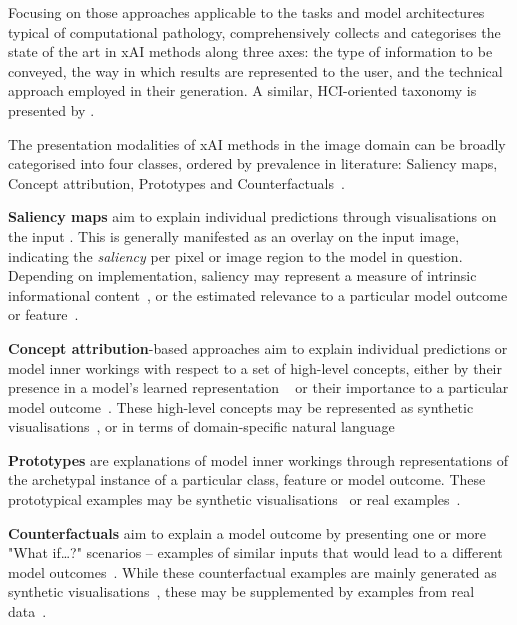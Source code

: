 \documentclass[final,5p,times,twocolumn,hyphens]{elsarticle}
\begin{document}
Focusing on those approaches applicable to the tasks and model architectures typical of computational pathology, \citet{poceviciute_survey_2020} comprehensively collects and categorises the state of the art in xAI methods along three axes: the type of information to be conveyed, the way in which results are represented to the user, and the technical approach employed in their generation. A similar, HCI-oriented taxonomy is presented by \citet{liao2020questioning}. 

The presentation modalities of xAI methods in the image domain can be broadly categorised into four classes, ordered by prevalence in literature: Saliency maps, Concept attribution, Prototypes and Counterfactuals~\cite{bodria_benchmarking_2021}.

\textbf{Saliency maps} aim to explain individual predictions through visualisations on the input \cite{MorchEtAl:1995:Saliency}. This is generally manifested as an overlay on the input image, indicating the \textit{saliency} per pixel or image region to the model in question. Depending on implementation, saliency may represent a measure of intrinsic informational content~\cite{KadirBrady:2001:Saliency}, or the estimated relevance to a particular model outcome or feature~\cite{SimonyanVedaldiZisserman:2013:DeepInside, springenberg2014striving, yosinski2015deepvisualization, LapuschkinEtAl:2016:LRP, selvaraju2017grad, ribeiro2018anchors}.

\textbf{Concept attribution}-based approaches aim to explain individual predictions or model inner workings with respect to a set of high-level concepts, either by their presence in a model's learned representation ~\cite{GrazianiHenning:2020:ConceptAttribution} or their importance to a particular model outcome~\cite{kim2018interpretability}. These high-level concepts may be represented as synthetic visualisations~\cite{erhan2009visualizing, yosinski2015deepvisualization}, or in terms of domain-specific natural language~\cite{GrazianiHenning:2020:ConceptAttribution, kim2018interpretability} 

\textbf{Prototypes} are explanations of model inner workings through representations of the archetypal instance of a particular class, feature or model outcome. These prototypical examples may be synthetic visualisations~\cite{li2018deep} or real examples~\cite{kim2016examples}.

\textbf{Counterfactuals} aim to explain a model outcome by presenting one or more "What if\dots?" scenarios -- examples of similar inputs that would lead to a different model outcomes~\cite{ginsberg1986counterfactuals}. While these counterfactual examples are mainly generated as synthetic visualisations~\cite{seah2019chest, poceviciute_survey_2020, liu2019generative}, these may be supplemented by examples from real data~\cite{gulshad2021counterfactual}.
\end{document}
